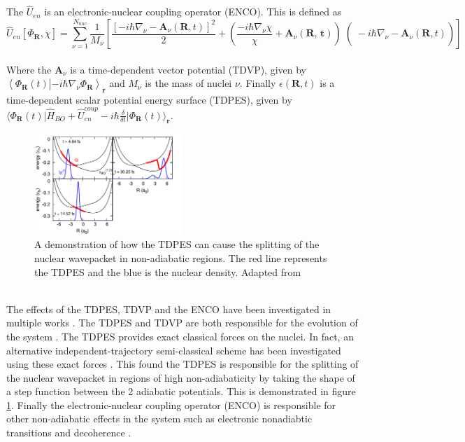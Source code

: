 \\\\
The $\hat{U}_{en}$ is an electronic-nuclear coupling operator (ENCO). This is defined as \begin{equation}
  \hat{U}_{en}[\Phi_{\textbf{R}}, \chi] = \sum_{\nu=1}^{N_{nuc}} \frac{1}{M_{\nu}} \left[ \frac{\left[-i \hbar \nabla_{\nu} - \textbf{A}_{\nu}(\textbf{R}, t) \right]^2}{2} + \left( \left. \left. \frac{-i\hbar \nabla_{\nu} \chi}{\chi} + \textbf{A}_{\nu}(\textbf{R, t})\right)\right( -i\hbar\nabla_{\nu} - \textbf{A}_{\nu}(\textbf{R}, t)\right) \right]
  \label{eq:ENCO}
\end{equation}
\\
Where the $\textbf{A}_{\nu}$ is a time-dependent vector potential (TDVP), given by $\left\langle \Phi_{\textbf{R}}(t) \right\vert \left. - i \hbar \nabla_{\nu} \Phi_{\textbf{R}} \right\rangle_{\textbf{r}}$ and $M_{\nu}$ is the mass of nuclei $\nu$.
Finally $\epsilon(\textbf{R}, t)$ is a time-dependent scalar potential energy surface (TDPES), given by $\langle \Phi_{\textbf{R}}(t) \vert \hat{H}_{BO} + \hat{U}_{en}^{coup} - i\hbar \frac{\delta}{\delta t} \vert \Phi_{\textbf{R}}(t) \rangle_{\textbf{r}}$.
\\
\begin{figure}
  \includegraphics[width=0.5\textwidth]{./img/nuclear_splitting_TDPES.png}
  \caption{A demonstration of how the TDPES can cause the splitting of the nuclear wavepacket in non-adiabatic regions. The red line represents the TDPES and the blue is the nuclear density. Adapted from \cite{agostini_exact_2015} \label{fig:step_TDPES}}
\end{figure}
\\
The effects of the TDPES, TDVP and the ENCO have been investigated in multiple works \cite{agostini_semiclassical_2015, agostini_exact_2015, agostini_mixed_2013, abedi_dynamical_2013, Min2014Dec}. The TDPES and TDVP are both responsible for the evolution of the system
\cite{agostini_semiclassical_2015}.  The TDPES provides exact classical forces on the nuclei. In fact, an alternative independent-trajectory semi-classical scheme has been investigated using these exact forces \cite{agostini_exact_2015}. This found the TDPES is responsible for the splitting of the nuclear wavepacket in regions of high non-adiabaticity by taking the shape of a step function between the 2 adiabatic potentials. This is demonstrated in figure \ref{fig:step_TDPES}. Finally the electronic-nuclear coupling operator (ENCO) is responsible for other non-adiabatic effects in the system such as electronic nonadiabtic transitions and decoherence \cite{agostini_semiclassical_2015}.
